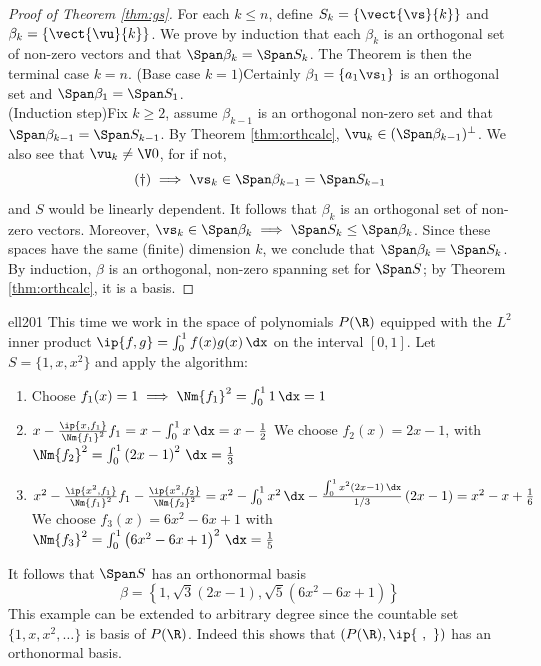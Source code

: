 \begin{proof}[Proof of Theorem \ref{thm:gs}]
For each $k\le n$, define $S_k=\{\vect{\vs}{k}\}$ and $\beta_k=\{\vect{\vu}{k}\}$. We prove by induction that each $\beta_k$  is an orthogonal set of non-zero vectors and that $\Span\beta_k=\Span S_k$. The Theorem is then the terminal case $k=n$.\smallbreak
(Base case $k=1$)\quad Certainly $\beta_1=\{a_1\vs_1\}$ is an orthogonal set and $\Span\beta_1=\Span S_1$.\\[5pt]
(Induction step)\quad Fix $k\ge 2$, assume $\beta_{k-1}$ is an orthogonal non-zero set and that $\Span \beta_{k-1}=\Span S_{k-1}$. By Theorem \ref{thm:orthcalc}, $\vu_k\in(\Span\beta_{k-1})^\perp$. We also see that $\vu_k\neq \V0$, for if not,
\[(\dag)\implies\vs_k\in\Span \beta_{k-1}=\Span S_{k-1}\]
and $S$ would be linearly dependent. It follows that $\beta_k$ is an orthogonal set of non-zero vectors.\smallbreak
Moreover, $\vs_k\in\Span \beta_k\implies \Span S_k\le\Span \beta_k$. Since these spaces have the same (finite) dimension $k$, we conclude that $\Span \beta_k=\Span S_k$.\smallbreak
By induction, $\beta$ is an orthogonal, non-zero spanning set for $\Span S$; by Theorem \ref{thm:orthcalc}, it is a basis.
\end{proof}
\goodbreak

\begin{example}{}{ell201}
This time we work in the space of polynomials $P(\R)$ equipped with the $L^2$ inner product $\ip{f,g}=\int_0^1f(x)g(x)\,\dx$ on the interval $[0,1]$. Let $S=\{1,x,x^2\}$ and apply the algorithm:
\begin{enumerate}
	\item Choose $f_1(x)=1 \implies \Nm{f_1}^2=\int_0^11\,\dx=1$
	\item $x-\frac{\ip{x,f_1}}{\Nm{f_1}^2}f_1=x-\int_0^1x\,\dx =x-\frac 12$\smallbreak
	We choose $f_2(x)=2x-1$, with $\Nm{f_2}^2=\int_0^1\left(2x-1\right)^2\,\dx=\frac 1{3}$
	\item	$x^2-\frac{\ip{x^2,f_1}}{\Nm{f_1}^2}f_1-\frac{\ip{x^2,f_2}}{\Nm{f_2}^2}=
	x^2-\int_0^1x^2\,\dx-\frac{\int_0^1x^2\left(2x-1\right)\,\dx}{1/3}\left(2x-1\right)=x^2-x+\frac 16$\smallbreak
	We choose $f_3(x)=6x^2-6x+1$ with $\Nm{f_3}^2=\int_0^1\left(6x^2-6x+1\right)^2\,\dx=\frac 1{5}$
	\end{enumerate}
	It follows that $\Span S$ has an orthonormal basis
	\[\beta=\left\{1,\sqrt 3(2x-1),\sqrt 5(6x^2-6x+1)\right\}\]
	This example can be extended to arbitrary degree since the countable set $\{1,x,x^2,\ldots\}$ is basis of $P(\R)$. Indeed this shows that $(P(\R),\ip{\ ,\ })$ has an orthonormal basis. 
\end{example}









